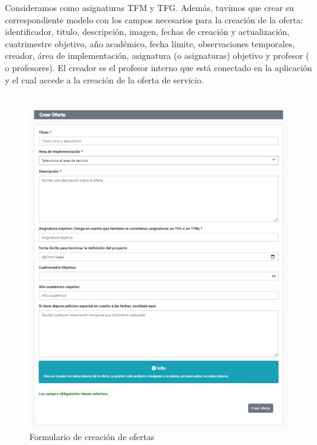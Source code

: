 \documentclass[11pt]{book}
\begin{document}
 Consideramos como asignaturas TFM y TFG.
 Además, tuvimos que crear su correspondiente modelo con los campos necesarios para la creación de la oferta: identificador, titulo, descripción, imagen, fechas de creación y actualización, cuatrimestre objetivo, año académico, fecha límite, observaciones temporales, creador, área de implementación, asignatura (o asignaturas) objetivo y profesor ( o profesores). El creador es el profesor interno que está conectado en la aplicación y el cual accede a la creación de la oferta de servicio.\\\\
 \begin{figure}[t]
 	\centering
 	\includegraphics[scale=0.9]{oferta}
 	\caption{Formulario de creación de ofertas}
 \end{figure}
\end{document}

